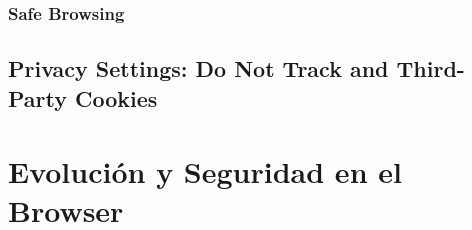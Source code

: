 	\subsubsection{Safe Browsing}


\subsection{Privacy Settings: Do Not Track and Third-Party Cookies}


\section{Evolución y Seguridad en el Browser}
